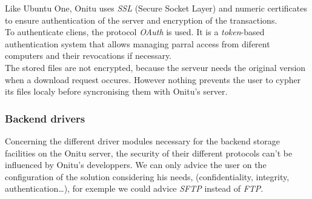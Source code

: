Like Ubuntu One, Onitu uses \textit{SSL} (Secure Socket Layer) and numeric certificates to ensure authentication of the server and encryption of the transactions.\\

To authenticate cliens, the protocol \textit{OAuth} is used. It is a \textit{token}-based authentication system that allows managing parral access from diferent computers and their revocations if necessary.\\

The stored files are not encrypted, because the serveur needs the original version when a download request occures. However nothing prevents the user to cypher its files localy before syncronising them with Onitu's server.

\subsubsection{Backend drivers}
Concerning the different driver modules necessary for the backend storage facilities on the Onitu server, the security of their different protocols can't be influenced by Onitu's developpers. We can only advice the user on the configuration of the solution considering his needs, (confidentiality, integrity, authentication…), for exemple we could advice \textit{SFTP} instead of \textit{FTP}.
